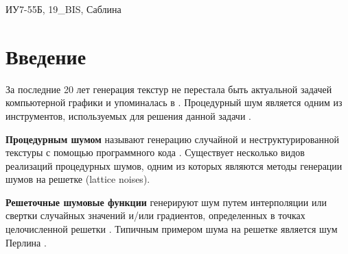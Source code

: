 ИУ7-55Б, 19\_BIS, Саблина\\
\let\oldclearpage\clearpage
\let\clearpage\relax


\chapter*{Введение}

\let\clearpage\oldclearpage


За последние 20 лет генерация текстур не перестала быть актуальной задачей компьютерной графики и упоминалась в \cite{procedural}\cite{focg}\cite{tandm}. Процедурный шум является одним из инструментов, используемых для решения данной задачи \cite{procedural}.

\textbf{Процедурным шумом} называют генерацию случайной и неструктурированной текстуры с помощью программного кода \cite{procedural}. Существует несколько видов реализаций процедурных шумов, одним из которых являются методы генерации шумов на решетке (lattice noises).

\textbf{Решеточные шумовые функции} генерируют шум путем интерполяции или свертки случайных значений и/или градиентов, определенных в точках целочисленной решетки \cite{procedural}. Типичным примером шума на решетке является шум Перлина \cite{procedural}.








